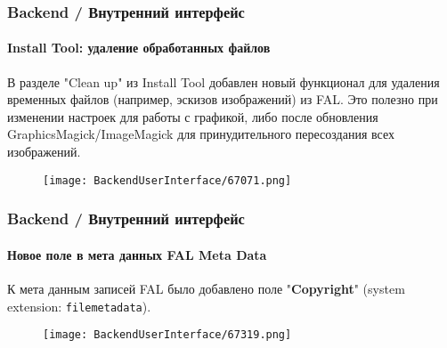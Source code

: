 \begin{frame}[fragile]
	\frametitle{Backend / Внутренний интерфейс}
	\framesubtitle{Install Tool: удаление обработанных файлов}

	В разделе "Clean up" из Install Tool добавлен новый функционал для удаления
	временных файлов (например, эскизов изображений) из FAL.\newline
	Это полезно при изменении настроек для работы с графикой, либо после обновления
	GraphicsMagick/ImageMagick для принудительного пересоздания всех изображений.

	\begin{figure}
		\texttt{[image: BackendUserInterface/67071.png]}
	\end{figure}

\end{frame}

\begin{frame}[fragile]
	\frametitle{Backend / Внутренний интерфейс}
	\framesubtitle{Новое поле в мета данных FAL Meta Data}

	К мета данным записей FAL было добавлено поле "\textbf{Copyright}"
	(system extension: \texttt{filemetadata}).

	\begin{figure}
		\texttt{[image: BackendUserInterface/67319.png]}
	\end{figure}

\end{frame}

